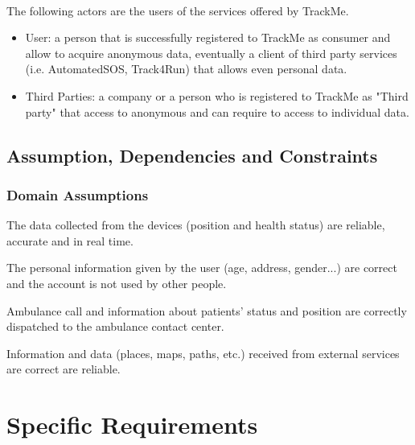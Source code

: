 \documentclass[a4paper]{article}
\begin{document}
    \paragraph{}The following actors are the users of the services offered by TrackMe. 
    
    
    \begin{itemize}
        \item User:  a person that is successfully registered to TrackMe as consumer and allow to acquire anonymous data, eventually a client of third party services (i.e. AutomatedSOS, Track4Run) that allows even personal data.
        
        \item Third Parties:  a company or a person who is registered to TrackMe as "Third party" that access to anonymous and can require to access to individual data.
        
    \end{itemize}
    
    \subsection{Assumption, Dependencies and Constraints}
    
    \subsubsection{Domain Assumptions}
    
    
    \begin{enumerate}[label={[D.\arabic*]}]
        
        \item The data collected from the devices (position and health status) are reliable, accurate and in real time.
        \item The personal information given by the user (age, address, gender...) are correct and the account is not used by other people. 
        \item Ambulance call and information about patients' status and position are correctly dispatched to the ambulance contact center.
        \item Information and data (places, maps, paths, etc.) received from external services are correct are reliable.
        
    \end{enumerate}
    
    
    \section{Specific Requirements}
    
\end{document}
